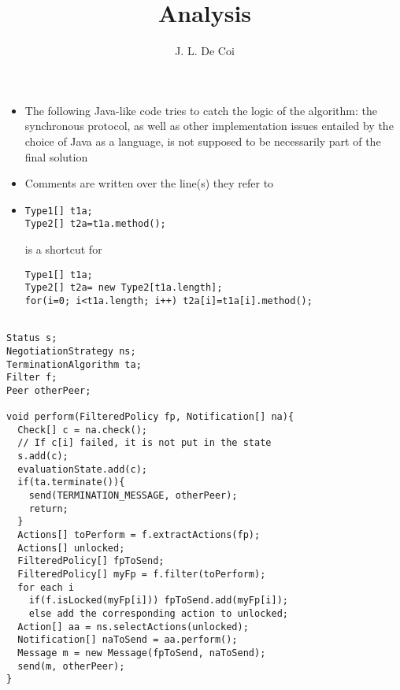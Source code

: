 \documentclass{article}
\begin{document}
\title{Analysis}
\author{J. L. De Coi}
\maketitle

\begin{itemize}
	\item The following Java-like code tries to catch the logic of the algorithm: the synchronous protocol, as well as other implementation issues entailed by the choice of Java as a language, is not supposed to be necessarily part of the final solution
	\item Comments are written over the line(s) they refer to
	\item
\begin{verbatim}
Type1[] t1a;
Type2[] t2a=t1a.method();

\end{verbatim}
is a shortcut for
\begin{verbatim}
Type1[] t1a;
Type2[] t2a= new Type2[t1a.length];
for(i=0; i<t1a.length; i++) t2a[i]=t1a[i].method();
\end{verbatim}
\end{itemize}

\begin{verbatim}

Status s;
NegotiationStrategy ns;
TerminationAlgorithm ta;
Filter f;
Peer otherPeer;

void perform(FilteredPolicy fp, Notification[] na){
  Check[] c = na.check();
  // If c[i] failed, it is not put in the state
  s.add(c);
  evaluationState.add(c);
  if(ta.terminate()){
    send(TERMINATION_MESSAGE, otherPeer);
    return;
  }
  Actions[] toPerform = f.extractActions(fp);
  Actions[] unlocked;
  FilteredPolicy[] fpToSend;
  FilteredPolicy[] myFp = f.filter(toPerform);
  for each i
    if(f.isLocked(myFp[i])) fpToSend.add(myFp[i]);
    else add the corresponding action to unlocked;
  Action[] aa = ns.selectActions(unlocked);
  Notification[] naToSend = aa.perform();
  Message m = new Message(fpToSend, naToSend);
  send(m, otherPeer);
}

\end{verbatim}

\begin{comment}

filtering(Action a){
   ProtuneNegEngine pne = new ProtuneNegEngine();
   myAa = pne.f1(a);
   while(myAa is not emptySet){
     A = execute(myAa);
     myAa = pne.f2(A);
   }
   return pne.f3(A);
}

\end{comment}
\end{document}
